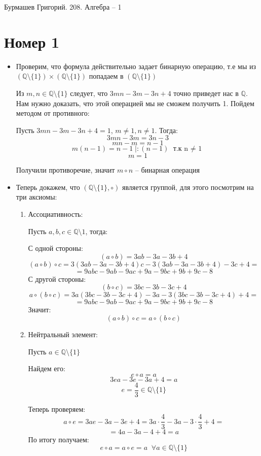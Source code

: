 \documentclass[a4paper,12pt]{article}
\author{Бурмашев Григорий, БПМИ-208}
\title{}
\date{\today}
\begin{document}
\begin{center}
Бурмашев Григорий. 208. Алгебра -- 1
\end{center}
\section*{Номер 1} 
\begin{itemize}
\item
Проверим, что формула действительно задает бинарную операцию, т.е мы из $ (\mathbb{Q} \setminus \{1\}) \times (\mathbb{Q} \setminus \{1\}) $ попадаем в $(\mathbb{Q} \setminus \{1\})$

Из  $m, n \in \mathbb{Q} \setminus \{1\}$ следует, что $3mn - 3m - 3n + 4$ точно приведет нас в $\mathbb{Q}$. Нам нужно  доказать, что этой операцией мы не сможем получить 1. Пойдем методом от противного:

\quad Пусть $3mn - 3m - 3n + 4 = 1$, $m \neq 1, n \neq 1 $. Тогда:
\[
3mn - 3m = 3n -3
\]
\[
mn - m  =  n - 1
\]
\[
m( n -1 ) = n - 1 \;  \bigg| : (n - 1) \text{ т.к n  $\neq $ 1}
\]
\[
m = 1
\]

\quad Получили противоречие, значит $m \circ n $ -- бинарная операция

\item Теперь докажем, что $\left( \mathbb{Q} \setminus \{1\}, \circ \right)$ является группой,  для этого посмотрим на три аксиомы:

\begin{enumerate}
\item Ассоциативность:

Пусть  $a, b, c \in \mathbb{Q} \setminus 1$, тогда:

\quad С одной стороны:
\[
(a \circ b) = 3ab - 3a - 3b + 4
\]
\[
(a \circ b) \circ c = 3(3ab - 3a - 3b + 4)c - 3(3ab - 3a - 3b + 4) - 3c + 4 = 
\]
\[
=
9 a b c - 9 a b - 9 a c + 9 a - 9 b c + 9 b + 9 c - 8
\]
\quad С другой стороны:
\[
(b \circ c) = 3bc - 3b - 3c + 4
\]
\[
a \circ (b \circ c) = 3a(3bc - 3b - 3c + 4) - 3a - 3(3bc - 3b -3c + 4)  + 4=
\]
\[
= 9 a b c - 9 a b - 9 a c + 9 a - 9 b c + 9 b + 9 c - 8
\]
Значит:
\[
(a \circ b) \circ c = a \circ (b \circ c)
\]


\item Нейтральный элемент:

Пусть $a \in \mathbb{Q} \setminus \{1\}$

\quad Найдем его:
\[
e \circ a = a
\]
\[
3ea - 3e - 3a + 4 = a
\]
\[
e = \frac{4}{3} \in \mathbb{Q} \setminus \{1\}
\]

\quad Теперь проверяем:
\[
a \circ e = 3ae - 3a - 3e + 4 = 3a \cdot \frac{4}{3} - 3a - 3\cdot \frac{4}{3} + 4 = 
\]
\[
= 4a - 3a -4 + 4 = a
\]
\quad По итогу получаем:
\[
e \circ a = a \circ e = a \; \; \forall a \in \mathbb{Q} \setminus \{1\}
\]


\end{enumerate}
\end{itemize}
\end{document}

